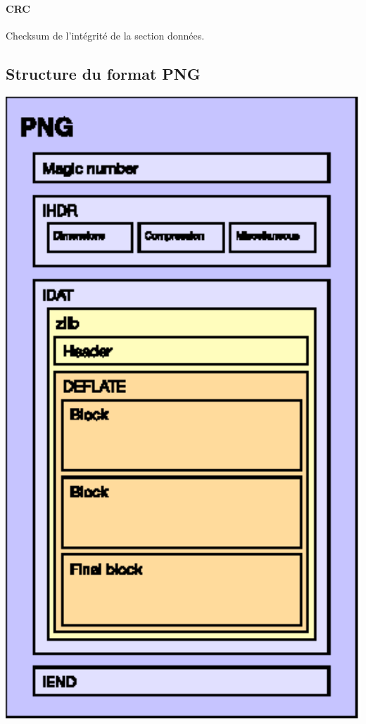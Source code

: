 \paragraph{CRC}
Checksum de l'intégrité de la section données.

\subsection{Structure du format PNG}
\includegraphics[width=1\textwidth]{img/png-file-format.eps}

